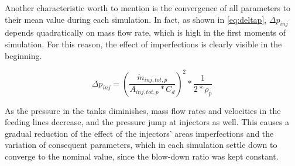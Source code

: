 Another characteristic worth to mention is the convergence of all parameters to their mean value during each simulation.  In fact, as shown in \autoref{eq:deltap}, $\Delta p_{inj}$ depends quadratically on mass flow rate, which is high in the first moments of simulation. For this reason, the effect of imperfections is clearly visible in the beginning.

\begin{equation}
    \Delta p_{inj} = \left(\frac{\dot m_{inj,tot,p}}{A_{inj,tot,p} * C_d}\right)^2 * \frac{1}{2*\rho _p}
    \label{eq:deltap}
\end{equation}



As the pressure in the tanks diminishes, mass flow rates and velocities in the feeding lines decrease, and the pressure jump at injectors as well. This causes a gradual reduction of the effect of the injectors' areas imperfections and the variation of consequent parameters, which in each simulation settle down to converge to the nominal value, since the blow-down ratio was kept constant. 










